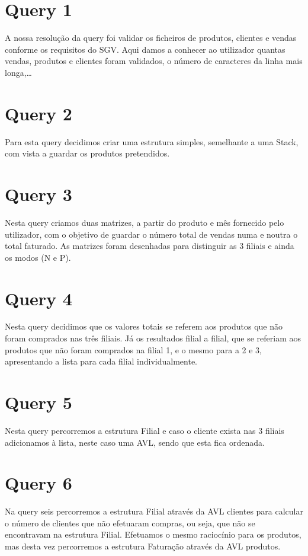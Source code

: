 \documentclass[a4paper,11pt]{report}
\begin{document}
\section*{Query 1}
A nossa resolução da query foi validar os ficheiros de produtos, clientes e vendas conforme os requisitos do SGV. Aqui damos a conhecer ao utilizador quantas vendas, produtos e clientes foram validados, o número de caracteres da linha mais longa,…

\section*{Query 2}
Para esta query decidimos criar uma estrutura simples, semelhante a uma Stack, com vista a guardar os produtos pretendidos.


\section*{Query 3}
Nesta query criamos duas matrizes, a partir do produto e mês fornecido pelo utilizador, com o objetivo de guardar o número total de vendas numa e noutra o total faturado. As matrizes foram desenhadas para distinguir as 3 filiais e ainda os modos (N e P).


\section*{Query 4}
Nesta query decidimos que os valores totais se referem aos produtos que não foram comprados nas três filiais. Já os resultados filial a filial, que se referiam aos produtos que não foram comprados na filial 1, e o mesmo para a 2 e 3, apresentando a lista para cada filial individualmente.

\section*{Query 5}
Nesta query percorremos a estrutura Filial e caso o cliente exista nas 3 filiais adicionamos à lista, neste caso uma AVL, sendo que esta fica ordenada.

\section*{Query 6}
Na query seis percorremos a estrutura Filial através da AVL clientes para calcular o número de clientes que não efetuaram compras, ou seja, que não se encontravam na estrutura Filial.
Efetuamos o mesmo raciocínio para os produtos, mas desta vez percorremos a estrutura Faturação através da AVL produtos.
\end{document}
